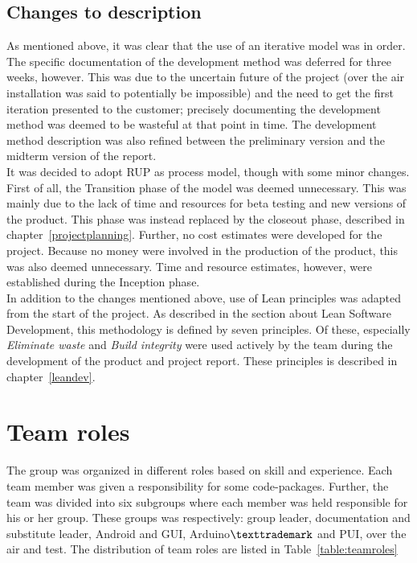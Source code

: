 \subsection{Changes to description}
As mentioned above, it was clear that the use of an iterative model was in order. The specific documentation of the development method was deferred for three weeks, however. This was due to the uncertain future of the project (over the air installation was said to potentially be impossible) and the need to get the first iteration presented to the customer; precisely documenting the development method was deemed to be wasteful at that point in time. The development method description was also refined between the preliminary version and the midterm version of the report.\\
\newline
It was decided to adopt RUP as process model, though with some minor changes. First of all, the Transition phase of the model was deemed unnecessary. This was mainly due to the lack of time and resources for beta testing and new versions of the product. This phase was instead replaced by the closeout phase, described in chapter~\ref{projectplanning}. Further, no cost estimates were developed for the project. Because no money were involved in the production of the product, this was also deemed unnecessary. Time and resource estimates, however, were established during the Inception phase. \\
\newline
In addition to the changes mentioned above, use of Lean principles was adapted from the start of the project. As described in the section about Lean Software Development, this methodology is defined by seven principles. Of these, especially \emph{Eliminate waste} and \emph{Build integrity} were used actively by the team during the development of the product and project report. These principles is described in chapter~\ref{leandev}.

\section{Team roles}
The group was organized in different roles based on skill and experience. Each team member was given a responsibility for some code-packages. Further, the team was divided into six subgroups where each member was held responsible for his or her group. These groups was respectively: group leader, documentation and substitute leader, Android and GUI, Arduino$\texttrademark$ and PUI, over the air and test.
The distribution of team roles are listed in Table~\ref{table:teamroles}

